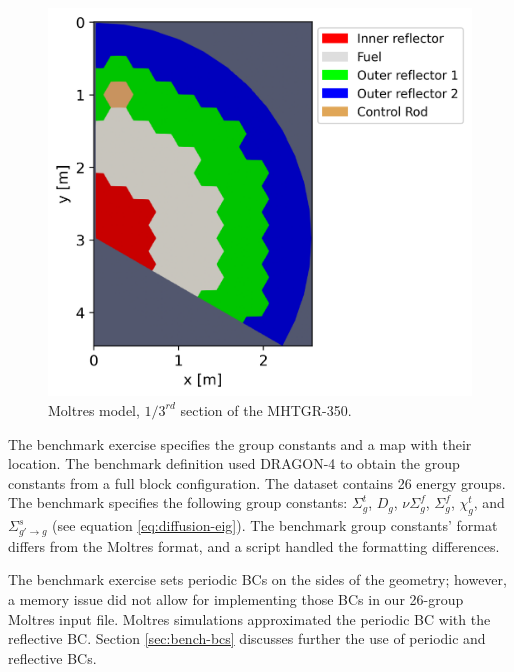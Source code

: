 \begin{figure}[htbp!]
	\centering
	\includegraphics[width=0.55\linewidth]{figures-neutronics/oecd-fullcore-legend}
	\hfill
	\caption{Moltres model, $1/3^{rd}$ section of the MHTGR-350.}
	\label{fig:bench-mesh}
\end{figure}


The benchmark exercise specifies the group constants and a map with their location.
The benchmark definition used DRAGON-4 \cite{marleau_user_2016} to obtain the group constants from a full block configuration.
The dataset contains 26 energy groups.
The benchmark specifies the following group constants: $\Sigma_g^t$, $D_g$, $\nu\Sigma_g^f$, $\Sigma_g^f$, $\chi_g^t$, and $\Sigma_{g'\rightarrow g}^s$ (see equation \ref{eq:diffusion-eig}).
The benchmark group constants' format differs from the Moltres format, and a script handled the formatting differences.

The benchmark exercise sets periodic \glspl{BC} on the sides of the geometry; however, a memory issue did not allow for implementing those BCs in our 26-group Moltres input file.
Moltres simulations approximated the periodic BC with the reflective BC.
Section \ref{sec:bench-bcs} discusses further the use of periodic and reflective BCs.

